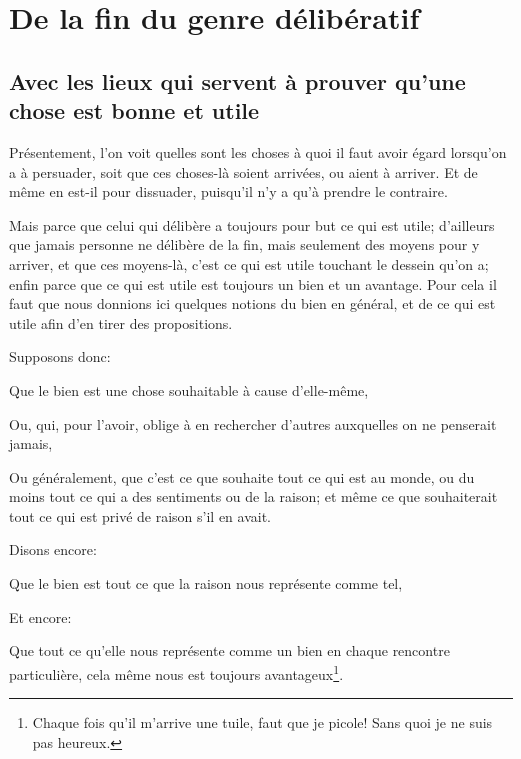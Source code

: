 
\section{De la fin du genre délibératif}
\subsection{Avec les lieux qui servent à prouver qu'une chose est bonne et utile}


Présentement, l'on voit quelles sont les choses à quoi il faut avoir égard lorsqu'on a à persuader, soit que ces choses-là
soient arrivées, ou aient à arriver. Et de même en est-il pour dissuader, puisqu'il n'y a qu'à prendre le contraire. 

Mais parce que celui qui délibère a toujours pour but ce qui est utile; d'ailleurs que jamais personne ne délibère de la
fin, mais seulement des moyens pour y arriver, et que ces moyens-là, c'est ce qui est utile touchant le dessein qu'on a;
enfin parce que ce qui est utile est toujours un bien et un avantage. Pour cela il faut que nous donnions ici quelques
notions du bien en général, et de ce qui est utile afin d'en tirer des propositions.

Supposons donc: 

\begin{emphpar}
	Que le bien est une chose souhaitable à cause d'elle-même,

	Ou, qui, pour l'avoir, oblige à en rechercher d'autres auxquelles on ne penserait jamais,

	Ou généralement, que c'est ce que souhaite tout ce qui est au monde, ou du moins tout ce qui a des sentiments ou de
	la raison; et même ce que souhaiterait tout ce qui est privé de raison s'il en avait.
\end{emphpar}

Disons encore:

\begin{emphpar}
	Que le bien est tout ce que la raison nous représente comme tel,
\end{emphpar}

Et encore:

\begin{emphpar}
	Que tout ce qu'elle nous représente comme un bien en chaque rencontre particulière, cela même nous est toujours
	avantageux\footnote{Chaque fois qu'il m'arrive une tuile, faut que je picole! Sans quoi je ne suis pas heureux.}.
\end{emphpar}

